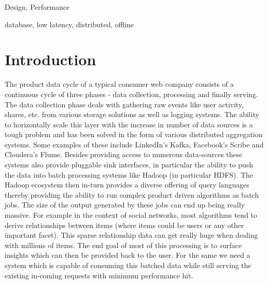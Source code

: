 \documentclass[10pt,twocolumn,preprint,natbib,authoryear]{sigplanconf}
\begin{document}

\terms
Design, Performance

\keywords
database, low latency, distributed, offline


\section{Introduction}
\label{sec:introduction}
The product data cycle of a typical consumer web company consists of a continuous cycle of three phases - data collection, processing and finally serving. The data collection phase deals with gathering raw events like user activity, shares, etc. from various storage solutions as well as logging systems. The ability to horizontally scale this layer with the increase in number of data sources is a tough problem and has been solved in the form of various distributed aggregation systems. Some examples of these include LinkedIn's Kafka\cite{kafka}, Facebook's Scribe\cite{scribe} and Cloudera's Flume\cite{flume}. Besides providing access to numerous data-sources these systems also provide pluggable sink interfaces, in particular the ability to push the data into batch processing systems like Hadoop (in particular HDFS)\cite{hadoop}. The Hadoop ecosystem then in-turn provides a diverse offering of query languages thereby providing the ability to run complex product driven algorithms as batch jobs. The size of the output generated by these jobs can end up being really massive. For example in the context of social networks, most algorithms tend to derive relationships between items (where items could be users or any other important facet). This sparse relationship data can get really huge when dealing with millions of items. The end goal of most of this processing is to surface insights which can then be provided back to the user. For the same we need a system which is capable of consuming this batched data while still serving the existing in-coming requests with minimum performance hit. 
\end{document}
